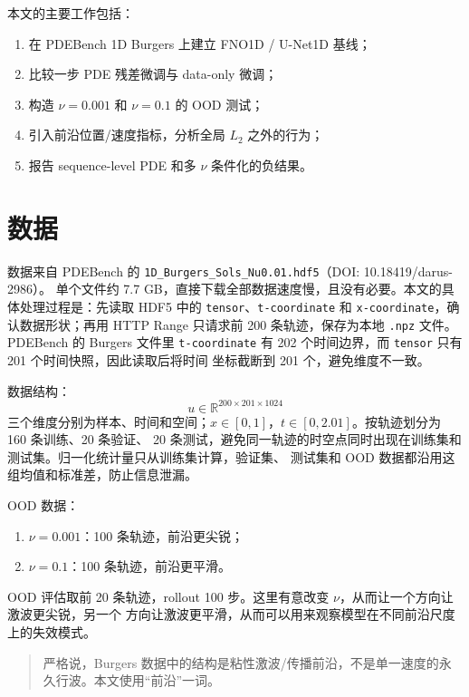 \documentclass[a4paper,11pt,fontset=windows]{ctexart}
\begin{document}
本文的主要工作包括：

\begin{enumerate}
  \item 在 PDEBench 1D Burgers 上建立 FNO1D / U-Net1D 基线；
  \item 比较一步 PDE 残差微调与 data-only 微调；
  \item 构造 $\nu=0.001$ 和 $\nu=0.1$ 的 OOD 测试；
  \item 引入前沿位置/速度指标，分析全局 $L_2$ 之外的行为；
  \item 报告 sequence-level PDE 和多 $\nu$ 条件化的负结果。
\end{enumerate}

\section{数据}

数据来自 PDEBench 的 \texttt{1D\_Burgers\_Sols\_Nu0.01.hdf5}（DOI: 10.18419/darus-2986）。
单个文件约 7.7 GB，直接下载全部数据速度慢，且没有必要。本文的具体处理过程是：先读取 HDF5 中的
\texttt{tensor}、\texttt{t-coordinate} 和 \texttt{x-coordinate}，确认数据形状；再用 HTTP Range
只请求前 200 条轨迹，保存为本地 \texttt{.npz} 文件。PDEBench 的 Burgers 文件里
\texttt{t-coordinate} 有 202 个时间边界，而 \texttt{tensor} 只有 201 个时间快照，因此读取后将时间
坐标截断到 201 个，避免维度不一致。

数据结构：
\begin{equation}
  u \in \mathbb{R}^{200 \times 201 \times 1024}
\end{equation}
三个维度分别为样本、时间和空间；$x\in[0,1]$，$t\in[0,2.01]$。按轨迹划分为 160 条训练、20 条验证、
20 条测试，避免同一轨迹的时空点同时出现在训练集和测试集。归一化统计量只从训练集计算，验证集、
测试集和 OOD 数据都沿用这组均值和标准差，防止信息泄漏。

OOD 数据：
\begin{enumerate}
  \item $\nu=0.001$：100 条轨迹，前沿更尖锐；
  \item $\nu=0.1$：100 条轨迹，前沿更平滑。
\end{enumerate}

OOD 评估取前 20 条轨迹，rollout 100 步。这里有意改变 $\nu$，从而让一个方向让激波更尖锐，另一个
方向让激波更平滑，从而可以用来观察模型在不同前沿尺度上的失效模式。

\begin{quote}
  \small 严格说，Burgers 数据中的结构是粘性激波/传播前沿，不是单一速度的永久行波。本文使用“前沿”一词。
\end{quote}
\end{document}
